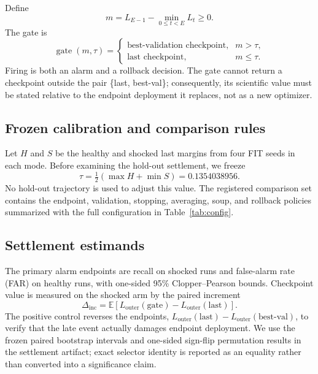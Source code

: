 \documentclass{article} %
\theoremstyle{remark}
\begin{document}
Define
\begin{equation}
 m=L_{E-1}-\min_{0\leq t<E}L_t\geq0.
\end{equation}
The gate is
\begin{equation}
\label{eq:gate}
\operatorname{gate}(m,\tau)=
\begin{cases}
\text{best-validation checkpoint}, & m>\tau,\\
\text{last checkpoint}, & m\leq\tau.
\end{cases}
\end{equation}
Firing is both an alarm and a rollback decision. The gate cannot return a checkpoint outside the
pair \{last, best-val\}; consequently, its scientific value must be stated relative to the endpoint
deployment it replaces, not as a new optimizer.

\subsection{Frozen calibration and comparison rules}
\label{sec:calibration}

Let $H$ and $S$ be the healthy and shocked last margins from four FIT seeds in each mode. Before
examining the hold-out settlement, we freeze
\begin{equation}
 \tau=\tfrac12\left(\max H+\min S\right)=0.1354038956.
\end{equation}
No hold-out trajectory is used to adjust this value. The registered comparison set contains the
endpoint, validation, stopping, averaging, soup, and rollback policies summarized with the full
configuration in Table~\ref{tab:config}.

\subsection{Settlement estimands}
\label{sec:settlement}

The primary alarm endpoints are recall on shocked runs and false-alarm rate (FAR) on healthy runs,
with one-sided 95\% Clopper--Pearson bounds. Checkpoint value is measured on the shocked arm by the
paired increment
\begin{equation}
 \Delta_{\mathrm{inc}}=
 \mathbb{E}\left[L_{\mathrm{outer}}(\mathrm{gate})-
 L_{\mathrm{outer}}(\mathrm{last})\right].
\end{equation}
The positive control reverses the endpoints,
$L_{\mathrm{outer}}(\mathrm{last})-L_{\mathrm{outer}}(\mathrm{best\text{-}val})$, to verify that
the late event actually damages endpoint deployment. We use the frozen paired bootstrap intervals
and one-sided sign-flip permutation results in the settlement artifact; exact selector identity is
reported as an equality rather than converted into a significance claim.
\end{document}
